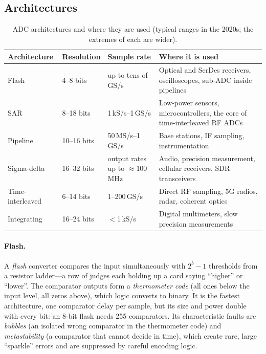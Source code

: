 \subsection{Architectures}

\begin{table}[htbp]\centering\small
\caption{ADC architectures and where they are used (typical ranges in the 2020s; the extremes
of each are wider).}
\label{tab:ch05:adcarch}
\begin{tabularx}{\linewidth}{@{}l l l X@{}}
\toprule
Architecture & Resolution & Sample rate & Where it is used \\
\midrule
Flash & 4--8 bits & up to tens of GS/s & Optical and SerDes receivers, oscilloscopes, sub-ADC inside pipelines \\
SAR & 8--18 bits & 1\,kS/s--1\,GS/s & Low-power sensors, microcontrollers, the core of time-interleaved RF ADCs \\
Pipeline & 10--16 bits & 50\,MS/s--1\,GS/s & Base stations, IF sampling, instrumentation \\
Sigma-delta & 16--32 bits & output rates up to $\approx$100\,MHz & Audio, precision measurement, cellular receivers, SDR transceivers \\
Time-interleaved & 6--14 bits & 1--200\,GS/s & Direct RF sampling, 5G radios, radar, coherent optics \\
Integrating & 16--24 bits & $<$1\,kS/s & Digital multimeters, slow precision measurements \\
\bottomrule
\end{tabularx}
\end{table}

\paragraph{Flash.} A \emph{flash} converter compares the input simultaneously with $2^b-1$
thresholds from a resistor ladder---a row of judges each holding up a card saying ``higher'' or
``lower''. The comparator outputs form a \emph{thermometer code} (all ones below the input level,
all zeros above), which logic converts to binary. It is the fastest architecture, one comparator
delay per sample, but its size and power double with every bit: an 8-bit flash needs 255
comparators. Its characteristic faults are \emph{bubbles} (an isolated wrong comparator in the
thermometer code) and \emph{metastability} (a comparator that cannot decide in time), which create
rare, large ``sparkle'' errors and are suppressed by careful encoding logic.

